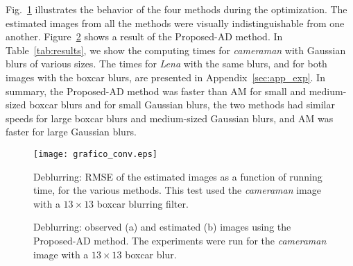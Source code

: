 \documentclass[10pt,twocolumn,twoside]{IEEEtran}
\begin{document}
Fig.~\ref{fig:grafico_conv} illustrates the behavior of the four methods during the optimization. The estimated images from all the methods were visually indistinguishable from one another. Figure~\ref{fig:cameraman} shows a result of the Proposed-AD method. In Table~\ref{tab:results}, we show the computing times for \emph{cameraman} with Gaussian blurs of various sizes. The times for \textit{Lena} with the same blurs, and for both images with the boxcar blurs, are presented in Appendix~\ref{sec:app_exp}. In summary, the Proposed-AD method was faster than AM for small and medium-sized boxcar blurs and for small Gaussian blurs, the two methods had similar speeds for large boxcar blurs and medium-sized Gaussian blurs, and AM was faster for large Gaussian blurs.



\begin{figure}[!t]
	\centering
	\vspace{-6pt}
	\texttt{[image: grafico\_conv.eps]}%
	\vspace{-6pt}
	\caption{Deblurring: RMSE of the estimated images as a function of running time, for the various methods. This test used the \textit{cameraman} image with a $13 \times 13$ boxcar blurring filter.}
	\label{fig:grafico_conv}
\end{figure}

\begin{figure}[!t]
		\vspace{-10pt}
	\centering
	\hfil
	\caption{Deblurring: observed (a) and estimated (b) images using the Proposed-AD method. The experiments were run for the \textit{cameraman} image with a $13 \times 13$ boxcar blur.}
	\label{fig:cameraman}
		\vspace{-15pt}
\end{figure}
\end{document}
